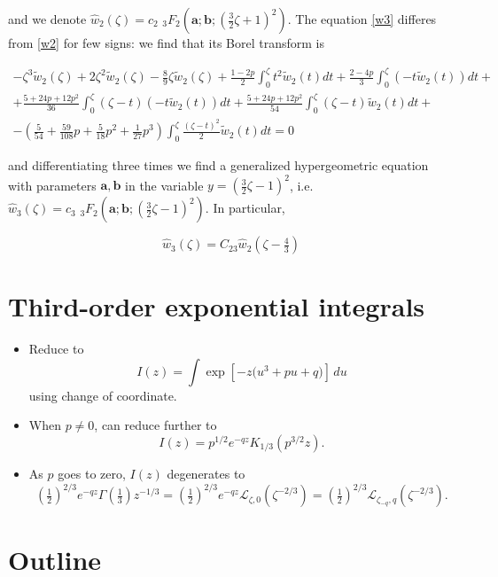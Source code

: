 \documentclass{article}
\newcommand{\laplace}{\mathcal{L}}
\begin{document}
and we denote $\hat{w}_2(\zeta)=c_2\,\, {}_3F_2\left(\mathbf{a};\mathbf{b};\left(\tfrac{3}{2}\zeta+1\right)^2\right)$. The equation \eqref{w3} differes from \eqref{w2} for few signs: we find that its Borel transform is 

\begin{multline}
-\zeta^3\tilde{w}_2(\zeta)+2\zeta^2\tilde{w}_2(\zeta)-\frac{8}{9}\zeta\tilde{w}_2(\zeta)+\frac{1-2p}{2}\int_0^\zeta t^2\tilde{w}_2(t)dt+\frac{2-4p}{3}\int_0^\zeta(-t\tilde{w}_2(t))dt+\\
+\frac{5+24p+12p^2}{36}\int_0^\zeta(\zeta-t)(-t\tilde{w}_2(t))dt
+\frac{5+24p+12p^2}{54}\int_0^\zeta(\zeta-t)\tilde{w}_2(t)dt +\\
-\left(\frac{5}{54}+\frac{59}{108}p+\frac{5}{18}p^2+\frac{1}{27}p^3\right)\int_0^\zeta\frac{(\zeta-t)^2}{2}\tilde{w}_2(t)dt=0
\end{multline}

and differentiating three times we find a generalized hypergeometric equation with parameters $\mathbf{a},\mathbf{b}$ in the variable $y=\left(\tfrac{3}{2}\zeta-1\right)^2$, i.e. $\hat{w}_3(\zeta)= c_3\,\, {}_3F_2\left(\mathbf{a};\mathbf{b};\left(\tfrac{3}{2}\zeta-1\right)^2\right)$. In particular, 

\begin{equation}
\hat{w}_3(\zeta)=C_{23}\hat{w}_2(\zeta-\tfrac{4}{3})
\end{equation}

\color{DarkTurquoise}

\section{Third-order exponential integrals}
\begin{itemize}
\item Reduce to
\[ I(z) = \int \exp\left[-z\big(u^3 + pu + q)\right]\,du \]
using change of coordinate.
\item When $p \neq 0$, can reduce further to
\[ I(z) = p^{1/2} e^{-qz} K_{1/3}(p^{3/2} z). \]
\item As $p$ goes to zero, $I(z)$ degenerates to
\[ \left(\tfrac{1}{2}\right)^{2/3} e^{-qz} \Gamma(\tfrac{1}{3}) z^{-1/3} = \left(\tfrac{1}{2}\right)^{2/3} e^{-qz} \laplace_{\zeta,0}(\zeta^{-2/3}) = \left(\tfrac{1}{2}\right)^{2/3} \laplace_{\zeta_{-q},q}(\zeta^{-2/3}). \]
\end{itemize}


\color{orange}
\section*{Outline}
\end{document}
